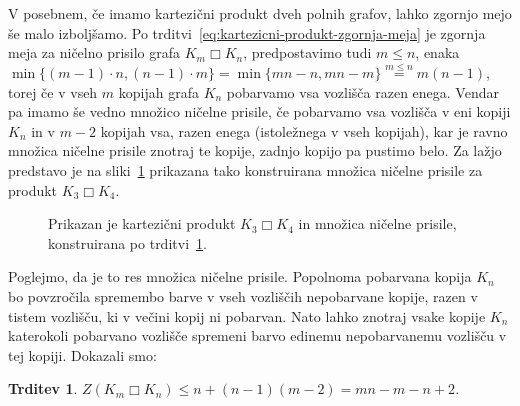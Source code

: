 \documentclass[12pt,a4paper,twoside]{article}
\theoremstyle{definition} %
\theoremstyle{plain} %
\newtheorem{trditev}[definicija]{Trditev}
\numberwithin{equation}{section}  %
\DeclareMathOperator{\boxempty}{\Box}
\begin{document}
V posebnem, če imamo kartezični produkt dveh polnih grafov, lahko zgornjo mejo še malo izboljšamo. Po trditvi~\ref{eq:kartezicni-produkt-zgornja-meja} je zgornja meja za ničelno prisilo grafa $K_m \boxempty K_n$, predpostavimo tudi $m \leq n$, enaka $\min \{(m-1)\cdot n, (n-1) \cdot m\} = \min \{ mn - n , mn - m\} \stackrel{m \leq n}{=} m (n-1) $, torej če v vseh $m$ kopijah grafa $K_n$ pobarvamo vsa vozlišča razen enega. Vendar pa imamo še vedno množico ničelne prisile, če pobarvamo vsa vozlišča v eni kopiji $K_n$ in v $m-2$ kopijah vsa, razen enega (istoležnega v vseh kopijah), kar je ravno množica ničelne prisile znotraj te kopije, zadnjo kopijo pa pustimo belo. Za lažjo predstavo je na sliki~\ref{fig:zf-kartezicni-produkt-polnih} prikazana tako konstruirana množica ničelne prisile za produkt $K_3 \boxempty K_4$.
\begin{figure}[h]
    \centering
\caption{Prikazan je kartezični produkt $K_3 \boxempty K_4$ in množica ničelne prisile, konstruirana po trditvi~\ref{trd:kartezicni-produkt-zgornja-meja-polni}.}
\label{fig:zf-kartezicni-produkt-polnih}
\end{figure}

Poglejmo, da je to res množica ničelne prisile. Popolnoma pobarvana kopija $K_n$ bo povzročila spremembo barve v vseh vozliščih nepobarvane kopije, razen v tistem vozlišču, ki v večini kopij ni pobarvan. Nato lahko znotraj vsake kopije $K_n$ katerokoli pobarvano vozlišče spremeni barvo edinemu nepobarvanemu vozlišču v tej kopiji. Dokazali smo:
\begin{trditev}
    \label{trd:kartezicni-produkt-zgornja-meja-polni}
    $Z(K_m \boxempty K_n) \leq n + (n-1)(m-2) = m n - m - n + 2$.
\end{trditev}
\end{document}

